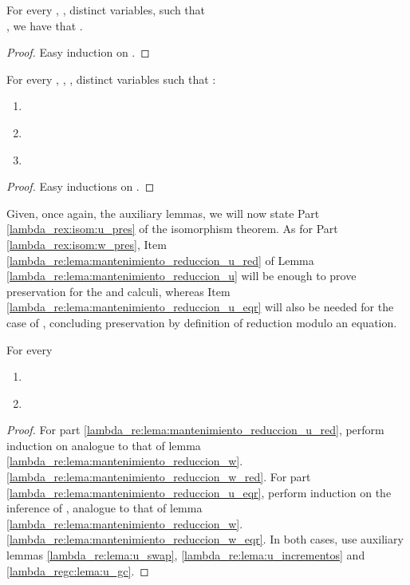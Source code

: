 \begin{lemma}\label{lambda_re:lema:u_incrementos}
For every , ,  distinct variables,  such that \\
, we have that
.
    \begin{proof}
    Easy induction on .
    \end{proof}
\end{lemma}

\begin{lemma}\label{lambda_regc:lema:u_gc}
For every , , ,
 distinct variables such that :
    \begin{enumerate}
        \item \label{lambda_regc:lema:u_gc:not} 

        \item \label{lambda_regc:lema:u_gc:in} 

        \item \label{lambda_regc:lema:u_gc:dec} 
    \end{enumerate}
    \begin{proof}
    Easy inductions on .
    \end{proof}
\end{lemma}

Given, once again, the auxiliary lemmas, we will now state Part
\ref{lambda_rex:isom:u_pres} of the isomorphism theorem. As for Part
\ref{lambda_rex:isom:w_pres}, Item
\ref{lambda_re:lema:mantenimiento_reduccion_u_red} of Lemma
\ref{lambda_re:lema:mantenimiento_reduccion_u} will be enough to prove
preservation for the  and  calculi, whereas Item
\ref{lambda_re:lema:mantenimiento_reduccion_u_eqr} will also be needed for the
case of , concluding preservation by definition of reduction modulo
an equation.

\begin{lemma}\label{lambda_re:lema:mantenimiento_reduccion_u}
For every 
    \begin{enumerate}
        \item \label{lambda_re:lema:mantenimiento_reduccion_u_red} 
        \item \label{lambda_re:lema:mantenimiento_reduccion_u_eqr} 
    \end{enumerate}
    
    \begin{proof}
    For part \ref{lambda_re:lema:mantenimiento_reduccion_u_red}, perform induction on  analogue to that
    of lemma \ref{lambda_re:lema:mantenimiento_reduccion_w}.\ref{lambda_re:lema:mantenimiento_reduccion_w_red}. 
    For part \ref{lambda_re:lema:mantenimiento_reduccion_u_eqr}, perform induction on the inference of , analogue to
    that of lemma \ref{lambda_re:lema:mantenimiento_reduccion_w}.\ref{lambda_re:lema:mantenimiento_reduccion_w_eqr}. In both cases,
    use auxiliary lemmas \ref{lambda_re:lema:u_swap}, \ref{lambda_re:lema:u_incrementos} and \ref{lambda_regc:lema:u_gc}.
    \end{proof}

\end{lemma}
